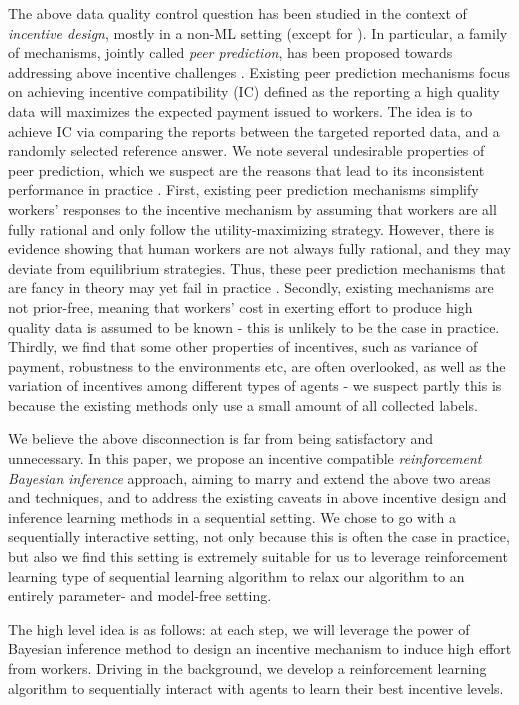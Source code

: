 The above data quality control question has been studied in the context of \emph{incentive design}, mostly in a non-ML setting (except for \cite{cite my EC'17 paper}). In particular, a family of mechanisms, jointly called \emph{peer prediction}, has been proposed towards addressing above incentive challenges \cite{}. Existing peer prediction mechanisms focus on achieving incentive compatibility (IC) defined as the reporting a high quality data will maximizes the expected payment issued to workers. The idea is to achieve IC via comparing the reports between the targeted reported data, and a randomly selected reference answer. We note several undesirable properties of peer prediction, which we suspect are the reasons that lead to its inconsistent performance in practice \cite{}. First, existing peer prediction mechanisms simplify workers' responses to the incentive mechanism by assuming that workers are all fully rational and only follow the utility-maximizing strategy. However, there is evidence showing that human workers are not always fully rational, and they may deviate from equilibrium strategies. Thus, these peer prediction mechanisms that are fancy in theory may yet fail in practice \cite{}. Secondly, existing mechanisms are not prior-free, meaning that workers' cost in exerting effort to produce high quality data is assumed to be known - this is unlikely to be the case in practice. Thirdly, we find that some other properties of incentives, such as variance of payment, robustness to the environments etc, are often overlooked, as well as the variation of incentives among different types of agents - we suspect partly this is because the existing methods only use a small amount of all collected labels.



We believe the above disconnection is far from being satisfactory and unnecessary. In this paper, we propose an incentive compatible \emph{reinforcement Bayesian inference} approach, aiming to marry and extend the above two areas and techniques, and to address the existing caveats in above incentive design and inference learning methods in a sequential setting. We chose to go with a sequentially interactive setting, not only because this is often the case in practice, but also we find this setting is extremely suitable for us to leverage reinforcement learning type of sequential learning algorithm to relax our algorithm to an entirely parameter- and model-free setting. 

The high level idea is as follows: at each step, we will leverage the power of Bayesian inference method to design an incentive mechanism to induce high effort from workers. Driving in the background, we develop a reinforcement learning algorithm to sequentially interact with agents to learn their best incentive levels. 


